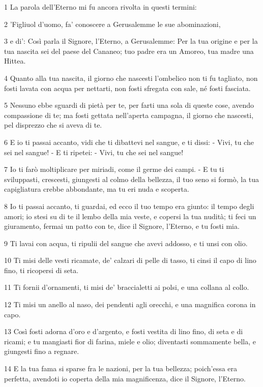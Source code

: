 \par 1 La parola dell'Eterno mi fu ancora rivolta in questi termini:
\par 2 'Figliuol d'uomo, fa' conoscere a Gerusalemme le sue abominazioni,
\par 3 e di': Così parla il Signore, l'Eterno, a Gerusalemme: Per la tua origine e per la tua nascita sei del paese del Cananeo; tuo padre era un Amoreo, tua madre una Hittea.
\par 4 Quanto alla tua nascita, il giorno che nascesti l'ombelico non ti fu tagliato, non fosti lavata con acqua per nettarti, non fosti sfregata con sale, né fosti fasciata.
\par 5 Nessuno ebbe sguardi di pietà per te, per farti una sola di queste cose, avendo compassione di te; ma fosti gettata nell'aperta campagna, il giorno che nascesti, pel disprezzo che si aveva di te.
\par 6 E io ti passai accanto, vidi che ti dibattevi nel sangue, e ti dissi: - Vivi, tu che sei nel sangue! - E ti ripetei: - Vivi, tu che sei nel sangue!
\par 7 Io ti farò moltiplicare per miriadi, come il germe dei campi. - E tu ti sviluppasti, crescesti, giungesti al colmo della bellezza, il tuo seno si formò, la tua capigliatura crebbe abbondante, ma tu eri nuda e scoperta.
\par 8 Io ti passai accanto, ti guardai, ed ecco il tuo tempo era giunto: il tempo degli amori; io stesi su di te il lembo della mia veste, e copersi la tua nudità; ti feci un giuramento, fermai un patto con te, dice il Signore, l'Eterno, e tu fosti mia.
\par 9 Ti lavai con acqua, ti ripulii del sangue che avevi addosso, e ti unsi con olio.
\par 10 Ti misi delle vesti ricamate, de' calzari di pelle di tasso, ti cinsi il capo di lino fino, ti ricopersi di seta.
\par 11 Ti fornii d'ornamenti, ti misi de' braccialetti ai polsi, e una collana al collo.
\par 12 Ti misi un anello al naso, dei pendenti agli orecchi, e una magnifica corona in capo.
\par 13 Così fosti adorna d'oro e d'argento, e fosti vestita di lino fino, di seta e di ricami; e tu mangiasti fior di farina, miele e olio; diventasti sommamente bella, e giungesti fino a regnare.
\par 14 E la tua fama si sparse fra le nazioni, per la tua bellezza; poich'essa era perfetta, avendoti io coperta della mia magnificenza, dice il Signore, l'Eterno.

